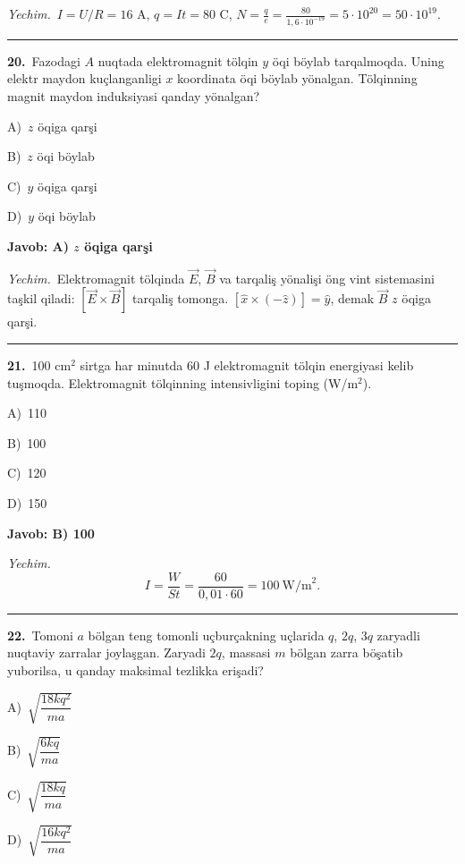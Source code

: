 \documentclass[11pt,a4paper]{article}
\newcommand{\opt}[2]{\hspace*{4mm}#1)\ #2\par}
\begin{document}
\noindent\textit{Yechim.}\ $I=U/R=16$ A, $q=It=80$ C, $N=\frac{q}{e}=\frac{80}{1{,}6\cdot10^{-19}}=5\cdot10^{20}=50\cdot10^{19}$.\par\par\medskip\hrule\medskip
{}\noindent\begin{minipage}{\linewidth}
\textbf{20.}\ Fazodagi $A$ nuqtada elektromagnit tölqin $y$ öqi böylab tarqalmoqda. Uning elektr maydon kuçlanganligi $x$ koordinata öqi böylab yönalgan. Tölqinning magnit maydon induksiyasi qanday yönalgan?\par\smallskip
\opt{A}{$z$ öqiga qarşi}
\opt{B}{$z$ öqi böylab}
\opt{C}{$y$ öqiga qarşi}
\opt{D}{$y$ öqi böylab}
\end{minipage}\vspace{2pt}\par
\noindent\colorbox{gray!12}{\parbox{\dimexpr\linewidth-2\fboxsep}{\textbf{Javob: A) $z$ öqiga qarşi}}}\par\smallskip
\noindent\textit{Yechim.}\ Elektromagnit tölqinda $\vec E$, $\vec B$ va tarqaliş yönalişi öng vint sistemasini taşkil qiladi: $[\vec E\times\vec B]$ tarqaliş tomonga. $[\hat x\times(-\hat z)]=\hat y$, demak $\vec B$ $z$ öqiga qarşi.\par\par\medskip\hrule\medskip
{}\noindent\begin{minipage}{\linewidth}
\textbf{21.}\ 100 cm$^{2}$ sirtga har minutda 60 J elektromagnit tölqin energiyasi kelib tuşmoqda. Elektromagnit tölqinning intensivligini toping (W/m$^{2}$).\par\smallskip
\opt{A}{110}
\opt{B}{100}
\opt{C}{120}
\opt{D}{150}
\end{minipage}\vspace{2pt}\par
\noindent\colorbox{gray!12}{\parbox{\dimexpr\linewidth-2\fboxsep}{\textbf{Javob: B) 100}}}\par\smallskip
\noindent\textit{Yechim.}\ \[I=\frac{W}{St}=\frac{60}{0{,}01\cdot60}=100\ \text{W/m}^2.\]\par\medskip\hrule\medskip
{}\noindent\begin{minipage}{\linewidth}
\textbf{22.}\ Tomoni $a$ bölgan teng tomonli uçburçakning uçlarida $q$, $2q$, $3q$ zaryadli nuqtaviy zarralar joylaşgan. Zaryadi $2q$, massasi $m$ bölgan zarra böşatib yuborilsa, u qanday maksimal tezlikka erişadi?\par\smallskip
\opt{A}{$\sqrt{\dfrac{18kq^2}{ma}}$}
\opt{B}{$\sqrt{\dfrac{6kq}{ma}}$}
\opt{C}{$\sqrt{\dfrac{18kq}{ma}}$}
\opt{D}{$\sqrt{\dfrac{16kq^2}{ma}}$}
\end{minipage}\vspace{2pt}\par
\end{document}
